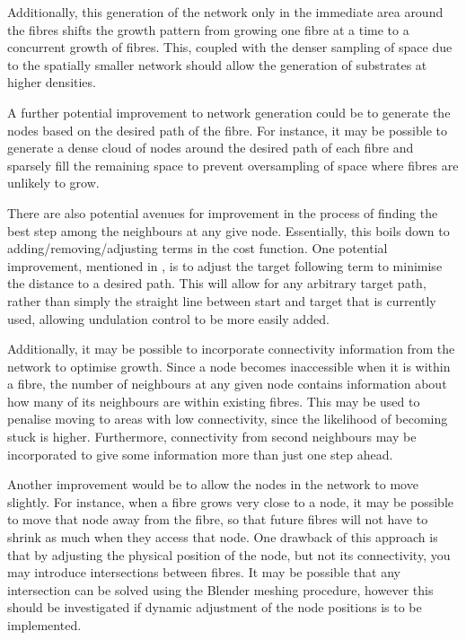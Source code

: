 Additionally, this generation of the network only in the immediate area around the fibres shifts the growth pattern from growing one fibre at a time to a concurrent growth of fibres.
This, coupled with the denser sampling of space due to the spatially smaller network should allow the generation of substrates at higher densities. 

A further potential improvement to network generation could be to generate the nodes based on the desired path of the fibre.
For instance, it may be possible to generate a dense cloud of nodes around the desired path of each fibre and sparsely fill the remaining space to prevent oversampling of space where fibres are unlikely to grow.

There are also potential avenues for improvement in the process of finding the best step among the neighbours at any give node.
Essentially, this boils down to adding/removing/adjusting terms in the cost function.
One potential improvement, mentioned in , is to adjust the target following term to minimise the distance to a desired path.
This will allow for any arbitrary target path, rather than simply the straight line between start and target that is currently used, allowing undulation control to be more easily added.

Additionally, it may be possible to incorporate connectivity information from the network to optimise growth.
Since a node becomes inaccessible when it is within a fibre, the number of neighbours at any given node contains information about how many of its neighbours are within existing fibres.
This may be used to penalise moving to areas with low connectivity, since the likelihood of becoming stuck is higher.
Furthermore, connectivity from second neighbours may be incorporated to give some information more than just one step ahead. 

Another improvement would be to allow the nodes in the network to move slightly.
For instance, when a fibre grows very close to a node, it may be possible to move that node away from the fibre, so that future fibres will not have to shrink as much when they access that node.
One drawback of this approach is that by adjusting the physical position of the node, but not its connectivity, you may introduce intersections between fibres.
It may be possible that any intersection can be solved using the Blender meshing procedure, however this should be investigated if dynamic adjustment of the node positions is to be implemented. 

